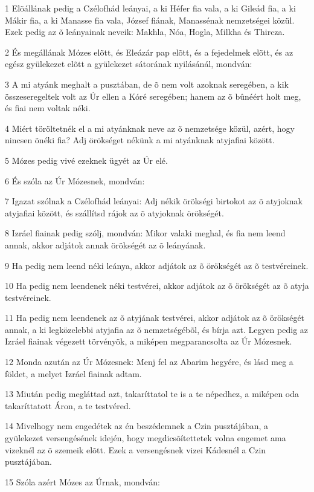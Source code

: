 \par 1 Elõállának pedig a Czélofhád leányai, a ki Héfer fia vala, a ki Gileád fia, a ki Mákir fia, a ki Manasse fia vala, József fiának, Manassénak nemzetségei közül. Ezek pedig az õ leányainak neveik: Makhla, Nóa, Hogla, Milkha és Thircza.
\par 2 És megállának Mózes elõtt, és Eleázár pap elõtt, és a fejedelmek elõtt, és az egész gyülekezet elõtt a gyülekezet sátorának nyilásánál, mondván:
\par 3 A mi atyánk meghalt a pusztában, de õ nem volt azoknak seregében, a kik összeseregeltek volt az Úr ellen a Kóré seregében; hanem az õ bûnéért  holt meg, és fiai nem voltak néki.
\par 4 Miért töröltetnék el a mi atyánknak neve az õ nemzetsége közül, azért, hogy nincsen õnéki fia? Adj örökséget nékünk a mi atyánknak atyjafiai között.
\par 5 Mózes pedig vivé ezeknek ügyét az Úr elé.
\par 6 És szóla az Úr Mózesnek, mondván:
\par 7 Igazat szólnak a Czélofhád leányai: Adj nékik örökségi birtokot az õ atyjoknak atyjafiai között, és szállítsd rájok az õ atyjoknak örökségét.
\par 8 Izráel fiainak pedig szólj, mondván: Mikor valaki meghal, és fia nem leend annak, akkor adjátok annak örökségét az õ leányának.
\par 9 Ha pedig nem leend néki leánya, akkor adjátok az õ örökségét az õ testvéreinek.
\par 10 Ha pedig nem leendenek néki testvérei, akkor adjátok az õ örökségét az õ atyja testvéreinek.
\par 11 Ha pedig nem leendenek az õ atyjának testvérei, akkor adjátok az õ örökségét annak, a ki legközelebbi atyjafia az õ nemzetségébõl, és bírja azt. Legyen pedig az Izráel fiainak végezett törvényök, a miképen megparancsolta az Úr Mózesnek.
\par 12 Monda azután az Úr Mózesnek: Menj fel az Abarim hegyére, és lásd meg a földet, a melyet Izráel fiainak adtam.
\par 13 Miután pedig megláttad azt, takaríttatol te is a te népedhez, a miképen oda takaríttatott Áron, a te testvéred.
\par 14 Mivelhogy nem engedétek az én beszédemnek a Czin pusztájában, a gyülekezet versengésének idején, hogy megdicsõítettetek volna engemet ama vizeknél az õ szemeik elõtt. Ezek a versengésnek vizei Kádesnél a Czin pusztájában.
\par 15 Szóla azért Mózes az Úrnak, mondván:
